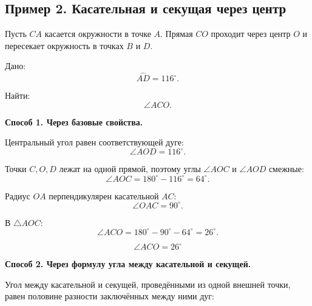 \documentclass[a4paper,12pt]{article}
\newcommand{\key}[1]{\textbf{\textcolor{darkaccent}{#1}}}
\begin{document}
\subsection*{Пример 2. Касательная и секущая через центр}

Пусть \(CA\) касается окружности в точке \(A\).
Прямая \(CO\) проходит через центр \(O\)
и пересекает окружность в точках \(B\) и \(D\).

Дано:
\[
\overset{\frown}{AD}=116^\circ.
\]

Найти:
\[
\angle ACO.
\]

\begin{center}
\end{center}

\key{Способ 1. Через базовые свойства.}

Центральный угол равен соответствующей дуге:
\[
\angle AOD=116^\circ.
\]

Точки \(C,O,D\) лежат на одной прямой, поэтому
углы \(\angle AOC\) и \(\angle AOD\) смежные:
\[
\angle AOC
=
180^\circ-116^\circ
=
64^\circ.
\]

Радиус \(OA\) перпендикулярен касательной \(AC\):
\[
\angle OAC=90^\circ.
\]

В \(\triangle AOC\):
\[
\angle ACO
=
180^\circ-90^\circ-64^\circ
=
26^\circ.
\]

\[
\boxed{\angle ACO=26^\circ}
\]

\key{Способ 2. Через формулу угла между касательной и секущей.}

Угол между касательной и секущей,
проведёнными из одной внешней точки,
равен половине разности заключённых между ними дуг:
\end{document}
